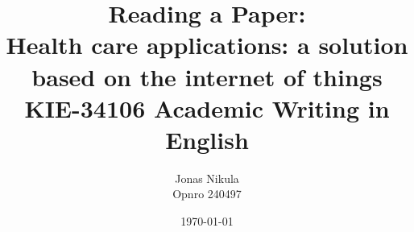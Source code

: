 \documentclass{article}
\title{Reading a Paper: \\ Health care applications: a solution based on the internet of things \\ KIE-34106 Academic Writing in English} %
\author{Jonas Nikula \\ Opnro 240497} %
\date{\today} %
\begin{document}
\maketitle %





\printbibliography{}

\end{document}

